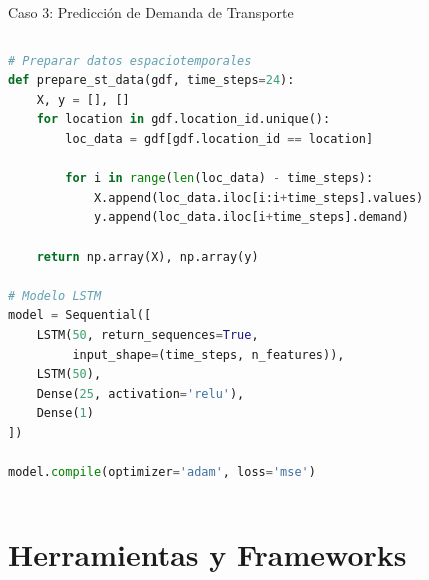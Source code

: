 \documentclass[10pt,aspectratio=169]{beamer}
\begin{document}
\begin{frame}{Caso 3: Predicción de Demanda de Transporte}
\begin{columns}
\begin{lstlisting}[language=Python,basicstyle=\tiny]
# Preparar datos espaciotemporales
def prepare_st_data(gdf, time_steps=24):
    X, y = [], []
    for location in gdf.location_id.unique():
        loc_data = gdf[gdf.location_id == location]

        for i in range(len(loc_data) - time_steps):
            X.append(loc_data.iloc[i:i+time_steps].values)
            y.append(loc_data.iloc[i+time_steps].demand)

    return np.array(X), np.array(y)

# Modelo LSTM
model = Sequential([
    LSTM(50, return_sequences=True,
         input_shape=(time_steps, n_features)),
    LSTM(50),
    Dense(25, activation='relu'),
    Dense(1)
])

model.compile(optimizer='adam', loss='mse')
        \end{lstlisting}
    \end{columns}
\end{frame}

\section{Herramientas y Frameworks}
\end{document}
